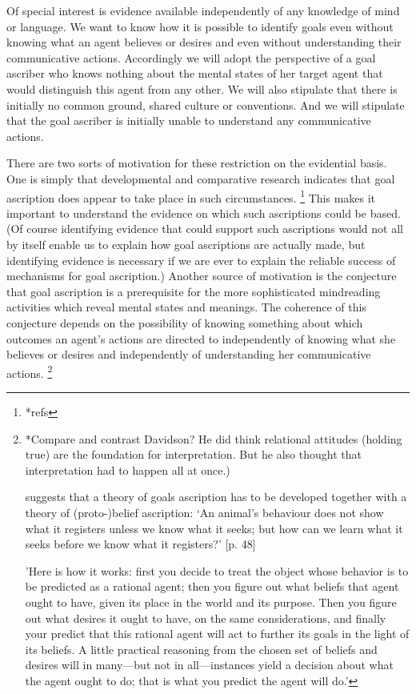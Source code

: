 \documentclass[12pt,a4paper]{extarticle}
\begin{document}
Of special interest is evidence available independently of any knowledge of mind or language.
We want to know how it is possible to identify goals even without knowing what an agent believes or desires and even without understanding their communicative actions.
Accordingly we will adopt the perspective of a goal ascriber who knows nothing about the mental states of her target agent that would distinguish this agent from any other.
We will also stipulate that there is initially no common ground, shared culture or conventions.
And we will stipulate that the goal ascriber is initially unable to understand any communicative actions.

There are two sorts of motivation for these restriction on the evidential basis.
One is simply that developmental and comparative research indicates that goal ascription does appear to take place  in such circumstances.%
\footnote{
*refs
}
This makes it important to understand the evidence on which such ascriptions could be based.
(Of course 
identifying evidence that could support such ascriptions 
would not all by itself enable us to explain how goal ascriptions are actually made, 
but identifying evidence is necessary if we are ever to explain the reliable success of mechanisms for goal ascription.)
Another source of motivation is the conjecture that goal ascription is a prerequisite for the more sophisticated mindreading activities which reveal mental states and meanings.
The coherence of this conjecture depends on the possibility of knowing something about which outcomes an agent's actions are directed to independently of knowing what she believes or desires and independently of understanding her communicative actions.%
\footnote{
*Compare and contrast Davidson?
He did think relational attitudes (holding true) are the foundation for interpretation.
But he also thought that interpretation had to happen all at once.)

\citet[pp.48--50]{Bennett:1976rg} suggests that a theory of goals ascription has to be developed together with a theory of (proto-)belief ascription: `An animal’s behaviour does not show what it registers unless we know what it seeks; but how can we learn what it seeks before we know what it registers?' [p. 48]

\citet[p.\ 17]{Dennett:1987sf} 'Here is how it works: first you decide to treat the object whose behavior is to be predicted as a rational agent; then you figure out what beliefs that agent ought to have, given its place in the world and its purpose.   Then you figure out what desires it ought to have, on the same considerations, and finally your predict that this rational agent will act to further its goals in the light of its beliefs.  A little practical reasoning from the chosen set of beliefs and desires will in many—but not in all—instances yield a decision about what the agent ought to do; that is what you predict the agent will do.'
}
\end{document}
